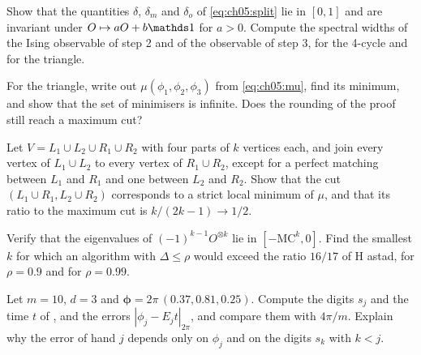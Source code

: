 \documentclass[handoutsbeamer.tex]{subfiles}
\begin{document}
\begin{frame}
\onp{\footnotesize}
\begin{exe}
Show that the quantities $\delta$, $\delta_m$ and $\delta_o$ of \eqref{eq:ch05:split} lie in $[0,1]$ and are invariant under $O\mapsto aO+b\one$ for $a>0$. Compute the spectral widths of the Ising observable of step 2 and of the observable of step 3, for the 4-cycle and for the triangle.
\end{exe}
\begin{exe}
For the triangle, write out $\mu(\phi_1,\phi_2,\phi_3)$ from \eqref{eq:ch05:mu}, find its minimum, and show that the set of minimisers is infinite. Does the rounding of the proof still reach a maximum cut?
\end{exe}
\begin{exe}\label{exe:ch05:persistent}
Let $V = L_1\cup L_2\cup R_1\cup R_2$ with four parts of $k$ vertices each, and join every vertex of $L_1\cup L_2$ to every vertex of $R_1\cup R_2$, except for a perfect matching between $L_1$ and $R_1$ and one between $L_2$ and $R_2$. Show that the cut $(L_1\cup R_1, L_2\cup R_2)$ corresponds to a strict local minimum of $\mu$, and that its ratio to the maximum cut is $k/(2k-1)\to1/2$.
\end{exe}
\end{frame}

\begin{frame}
\onp{\footnotesize}
\begin{exe}[Boosting]
Verify that the eigenvalues of $(-1)^{k-1}O^{\otimes k}$ lie in $[-\mathrm{MC}^k,0]$. Find the smallest $k$ for which an algorithm with $\Delta\le\rho$ would exceed the ratio $16/17$ of H astad, for $\rho = 0.9$ and for $\rho = 0.99$.
\end{exe}
\begin{exe}[A clock]\label{exe:ch05:clock}
Let $m = 10$, $d = 3$ and $\boldsymbol\phi = 2\pi\,(0.37, 0.81, 0.25)$. Compute the digits $s_j$ and the time $t$ of , and the errors $|\phi_j - E_jt|_{2\pi}$, and compare them with $4\pi/m$. Explain why the error of hand $j$ depends only on $\phi_j$ and on the digits $s_k$ with $k<j$.
\end{exe}
\end{frame}
\end{document}
